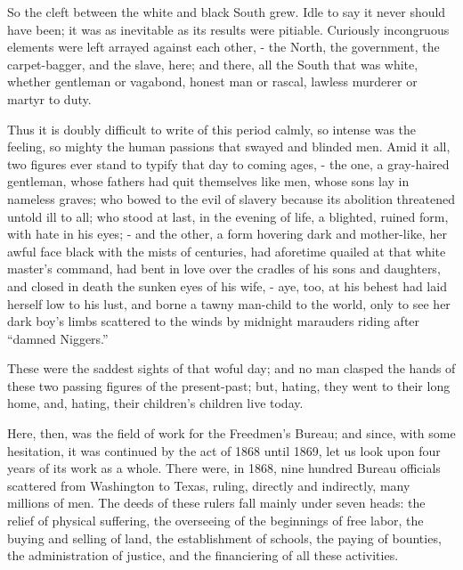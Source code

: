 So the cleft between the white and black South grew. Idle to say it never should have been; it was as inevitable as its results were pitiable. Curiously incongruous elements were left arrayed against each other, - the North, the government, the carpet-bagger, and the slave, here; and there, all the South that was white, whether gentleman or vagabond, honest man or rascal, lawless murderer or martyr to duty.\par

Thus it is doubly difficult to write of this period calmly, so intense was the feeling, so mighty the human passions that swayed and blinded men. Amid it all, two figures ever stand to typify that day to coming ages, - the one, a gray-haired gentleman, whose fathers had quit themselves like men, whose sons lay in nameless graves; who bowed to the evil of slavery because its abolition threatened untold ill to all; who stood at last, in the evening of life, a blighted, ruined form, with hate in his eyes; - and the other, a form hovering dark and mother-like, her awful face black with the mists of centuries, had aforetime quailed at that white master’s command, had bent in love over the cradles of his sons and daughters, and closed in death the sunken eyes of his wife, - aye, too, at his behest had laid herself low to his lust, and borne a tawny man-child to the world, only to see her dark boy’s limbs scattered to the winds by midnight marauders riding after “damned Niggers.”\par

These were the saddest sights of that woful day; and no man clasped the hands of these two passing figures of the present-past; but, hating, they went to their long home, and, hating, their children’s children live today.\par

Here, then, was the field of work for the Freedmen’s Bureau; and since, with some hesitation, it was continued by the act of 1868 until 1869, let us look upon four years of its work as a whole. There were, in 1868, nine hundred Bureau officials scattered from Washington to Texas, ruling, directly and indirectly, many millions of men. The deeds of these rulers fall mainly under seven heads: the relief of physical suffering, the overseeing of the beginnings of free labor, the buying and selling of land, the establishment of schools, the paying of bounties, the administration of justice, and the financiering of all these activities.\par

